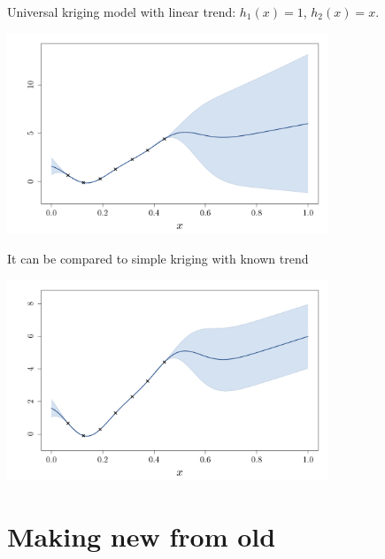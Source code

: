 \documentclass{beamer}
\begin{document}
\begin{frame}{}
Universal kriging model with linear trend: $h_1(x) = 1$, $h_2(x) = x$.
\begin{center}
	\includegraphics[height=6cm]{figures/R/trend_ku}
\end{center}
\end{frame}

\begin{frame}{}
It can be compared to simple kriging with known trend
\begin{center}
	\includegraphics[height=6cm]{figures/R/trend_kstrend}
\end{center}
\end{frame}

\section{Making new from old}
\subsection{}
\end{document}
